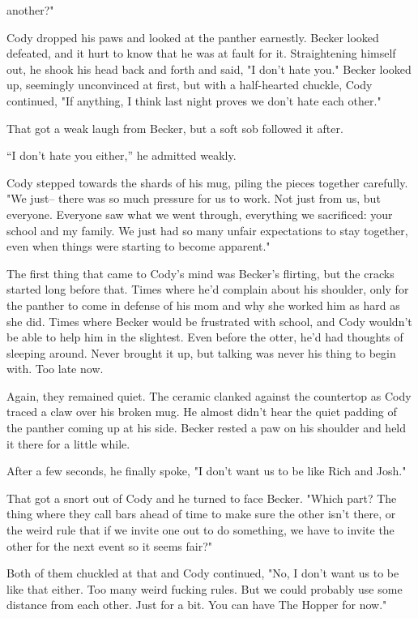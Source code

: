another?"

Cody dropped his paws and looked at the panther earnestly. Becker looked
defeated, and it hurt to know that he was at fault for it. Straightening
himself out, he shook his head back and forth and said, "I don't hate
you." Becker looked up, seemingly unconvinced at first, but with a
half-hearted chuckle, Cody continued, "If anything, I think last night
proves we don't hate each other."

That got a weak laugh from Becker, but a soft sob followed it after.

``I don't hate you either,'' he admitted weakly.

Cody stepped towards the shards of his mug, piling the pieces together
carefully. "We just-- there was so much pressure for us to work. Not
just from us, but everyone. Everyone saw what we went through,
everything we sacrificed: your school and my family. We just had so many
unfair expectations to stay together, even when things were starting to
become apparent."

The first thing that came to Cody's mind was Becker's flirting, but the
cracks started long before that. Times where he'd complain about his
shoulder, only for the panther to come in defense of his mom and why she
worked him as hard as she did. Times where Becker would be frustrated
with school, and Cody wouldn't be able to help him in the slightest.
Even before the otter, he'd had thoughts of sleeping around. Never
brought it up, but talking was never his thing to begin with. Too late
now.

Again, they remained quiet. The ceramic clanked against the countertop
as Cody traced a claw over his broken mug. He almost didn't hear the
quiet padding of the panther coming up at his side. Becker rested a paw
on his shoulder and held it there for a little while.

After a few seconds, he finally spoke, "I don't want us to be like Rich
and Josh."

That got a snort out of Cody and he turned to face Becker. "Which part?
The thing where they call bars ahead of time to make sure the other
isn't there, or the weird rule that if we invite one out to do
something, we have to invite the other for the next event so it seems
fair?"

Both of them chuckled at that and Cody continued, "No, I don't want us
to be like that either. Too many weird fucking rules. But we could
probably use some distance from each other. Just for a bit. You can have
The Hopper for now."

